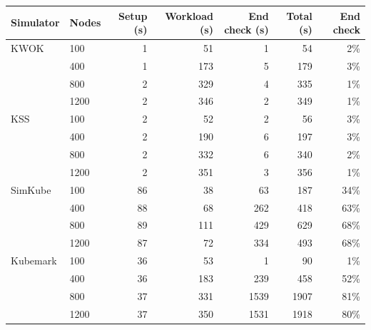 \begin{tabular}{llrrrrr}
\toprule
Simulator & Nodes & Setup (s) & Workload (s) & End check (s) & Total (s) & End check\\
\midrule
KWOK & 100 & 1 & 51 & 1 & 54 & 2\%\\
 & 400 & 1 & 173 & 5 & 179 & 3\%\\
 & 800 & 2 & 329 & 4 & 335 & 1\%\\
 & 1200 & 2 & 346 & 2 & 349 & 1\%\\
\addlinespace
KSS & 100 & 2 & 52 & 2 & 56 & 3\%\\
 & 400 & 2 & 190 & 6 & 197 & 3\%\\
 & 800 & 2 & 332 & 6 & 340 & 2\%\\
 & 1200 & 2 & 351 & 3 & 356 & 1\%\\
\addlinespace
SimKube & 100 & 86 & 38 & 63 & 187 & 34\%\\
 & 400 & 88 & 68 & 262 & 418 & 63\%\\
 & 800 & 89 & 111 & 429 & 629 & 68\%\\
 & 1200 & 87 & 72 & 334 & 493 & 68\%\\
\addlinespace
Kubemark & 100 & 36 & 53 & 1 & 90 & 1\%\\
 & 400 & 36 & 183 & 239 & 458 & 52\%\\
 & 800 & 37 & 331 & 1539 & 1907 & 81\%\\
 & 1200 & 37 & 350 & 1531 & 1918 & 80\%\\
\bottomrule
\end{tabular}
